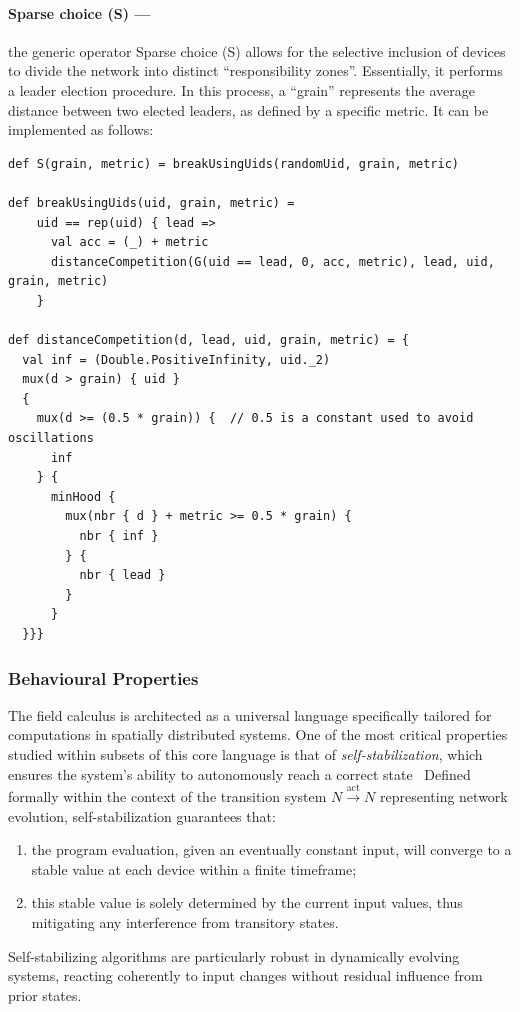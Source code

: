 \paragraph*{Sparse choice (S) --- }
the generic operator Sparse choice (S) 
 allows for the selective inclusion of devices to divide the network into distinct ``responsibility zones''. Essentially, it performs a leader election procedure. 
 In this process, a ``grain'' represents the average distance between two elected leaders, as defined by a specific metric. It can be implemented as follows:
\begin{lstlisting}[language=scafi]
def S(grain, metric) = breakUsingUids(randomUid, grain, metric)

def breakUsingUids(uid, grain, metric) =
    uid == rep(uid) { lead =>
      val acc = (_) + metric
      distanceCompetition(G(uid == lead, 0, acc, metric), lead, uid, grain, metric)
    }

def distanceCompetition(d, lead, uid, grain, metric) = {
  val inf = (Double.PositiveInfinity, uid._2)
  mux(d > grain) { uid }
  {
    mux(d >= (0.5 * grain)) {  // 0.5 is a constant used to avoid oscillations
      inf 
    } {
      minHood {
        mux(nbr { d } + metric >= 0.5 * grain) { 
          nbr { inf } 
        } { 
          nbr { lead } 
        }
      }
  }}}
\end{lstlisting}

\subsubsection{Behavioural Properties}\label{sec:field-calculus-behavioural-properties}
The field calculus is architected as a universal language specifically tailored for computations in spatially distributed systems. 
 One of the most critical properties studied within subsets of this core language is that of \emph{self-stabilization}, 
 which ensures the system's ability to autonomously reach a correct state~\cite{lafuente2015fixpoint}%
 Defined formally within the context of the transition system \( N \stackrel{\text{act}}{\rightarrow} N \) representing network evolution, self-stabilization guarantees that:
\begin{enumerate}
    \item the program evaluation, given an eventually constant input, 
    will converge to a stable value at each device within a finite timeframe;
    \item this stable value is solely determined by the current input values, 
    thus mitigating any interference from transitory states.
\end{enumerate}
Self-stabilizing algorithms are particularly robust in dynamically evolving systems, 
 reacting coherently to input changes without residual influence from prior states.

